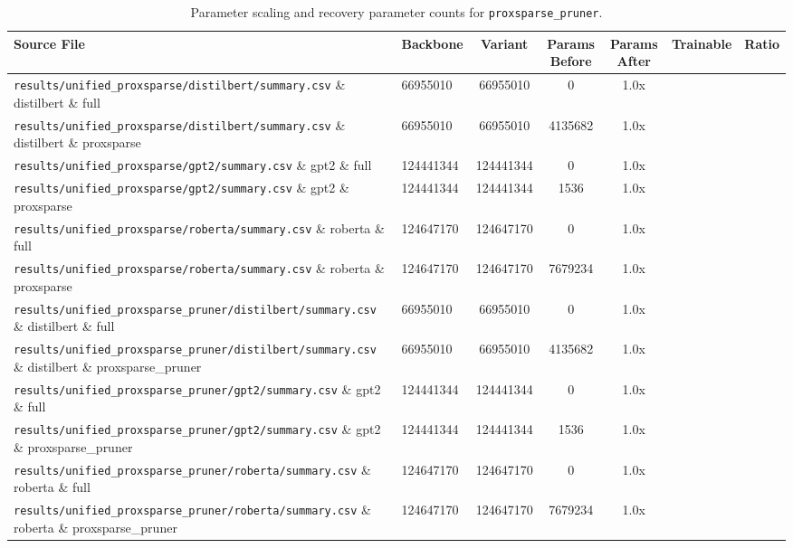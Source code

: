 \begin{table}[t]
\centering
\small
\begin{tabularx}{\linewidth}{llccccc}
\toprule
\textbf{Source File} & \textbf{Backbone} & \textbf{Variant} & \textbf{Params Before} & \textbf{Params After} & \textbf{Trainable} & \textbf{Ratio} \\
\midrule
\texttt{results/unified\_proxsparse/distilbert/summary.csv} \& distilbert \& full & 66955010 & 66955010 & 0 & 1.0x \\
\texttt{results/unified\_proxsparse/distilbert/summary.csv} \& distilbert \& proxsparse & 66955010 & 66955010 & 4135682 & 1.0x \\
\texttt{results/unified\_proxsparse/gpt2/summary.csv} \& gpt2 \& full & 124441344 & 124441344 & 0 & 1.0x \\
\texttt{results/unified\_proxsparse/gpt2/summary.csv} \& gpt2 \& proxsparse & 124441344 & 124441344 & 1536 & 1.0x \\
\texttt{results/unified\_proxsparse/roberta/summary.csv} \& roberta \& full & 124647170 & 124647170 & 0 & 1.0x \\
\texttt{results/unified\_proxsparse/roberta/summary.csv} \& roberta \& proxsparse & 124647170 & 124647170 & 7679234 & 1.0x \\
\texttt{results/unified\_proxsparse\_pruner/distilbert/summary.csv} \& distilbert \& full & 66955010 & 66955010 & 0 & 1.0x \\
\texttt{results/unified\_proxsparse\_pruner/distilbert/summary.csv} \& distilbert \& proxsparse\_pruner & 66955010 & 66955010 & 4135682 & 1.0x \\
\texttt{results/unified\_proxsparse\_pruner/gpt2/summary.csv} \& gpt2 \& full & 124441344 & 124441344 & 0 & 1.0x \\
\texttt{results/unified\_proxsparse\_pruner/gpt2/summary.csv} \& gpt2 \& proxsparse\_pruner & 124441344 & 124441344 & 1536 & 1.0x \\
\texttt{results/unified\_proxsparse\_pruner/roberta/summary.csv} \& roberta \& full & 124647170 & 124647170 & 0 & 1.0x \\
\texttt{results/unified\_proxsparse\_pruner/roberta/summary.csv} \& roberta \& proxsparse\_pruner & 124647170 & 124647170 & 7679234 & 1.0x \\
\bottomrule
\end{tabularx}
\caption{Parameter scaling and recovery parameter counts for \texttt{proxsparse\_pruner}.}
\label{tab:results_params_proxsparse\_pruner}
\end{table}

